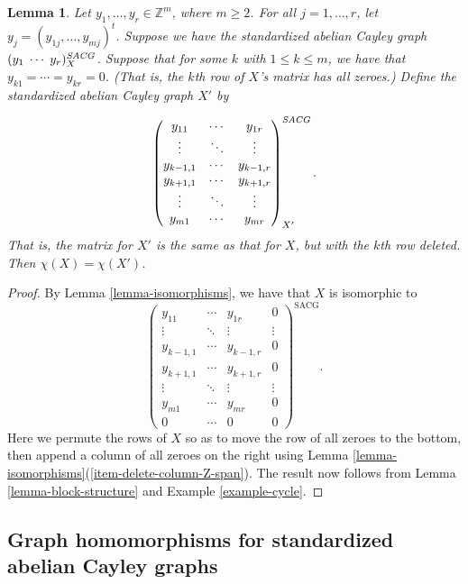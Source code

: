 \documentclass{article}
\newtheorem{Lem}[Thm]{Lemma}
\theoremstyle{definition}
\theoremstyle{remark}
\begin{document}
\begin{Lem}\label{lemma-delete-row-all-zeroes}
Let $y_1,\dots,y_r\in \mathbb{Z}^m$, where $m\geq 2$.  For all $j=1,\dots,r$, let $y_j=(y_{1j},\dots,y_{mj})^t$.  Suppose we have the standardized abelian Cayley graph $(y_1\;\cdots\;y_r)^{\emph{SACG}}_X$.  Suppose that for some $k$ with $1\leq k\leq m$, we have that $y_{k1}=\cdots=y_{kr}=0$.  (That is, the $k$th row of $X$'s matrix has all zeroes.)  Define the standardized abelian Cayley graph $X'$ by 

\[\begin{pmatrix}y_{11} & \cdots & y_{1r}\\
\vdots & \ddots & \vdots \\
y_{k-1,1} & \cdots & y_{k-1,r}\\
y_{k+1,1} & \cdots & y_{k+1,r}\\
\vdots & \ddots & \vdots \\
y_{m1} & \cdots & y_{mr}\end{pmatrix}^{\emph{SACG}}_{X'}.\]That is, the matrix for $X'$ is the same as that for $X$, but with the $k$th row deleted.  Then $\chi(X)=\chi(X')$.\end{Lem}\begin{proof}By Lemma \ref{lemma-isomorphisms}, we have that $X$ is isomorphic to \[\begin{pmatrix}y_{11} & \cdots & y_{1r} & 0\\
\vdots & \ddots & \vdots & \vdots \\
y_{k-1,1} & \cdots & y_{k-1,r} & 0\\
y_{k+1,1} & \cdots & y_{k+1,r} & 0\\
\vdots & \ddots & \vdots  & \vdots\\
y_{m1} & \cdots & y_{mr} & 0\\
0 & \cdots & 0 & 0\end{pmatrix}^{\text{SACG}}.\]Here we permute the rows of $X$ so as to move the row of all zeroes to the bottom, then append a column of all zeroes on the right using Lemma \ref{lemma-isomorphisms}(\ref{item-delete-column-Z-span}).  The result now follows from Lemma \ref{lemma-block-structure} and Example \ref{example-cycle}.\end{proof}


\subsection{Graph homomorphisms for standardized abelian Cayley graphs}
\end{document}
